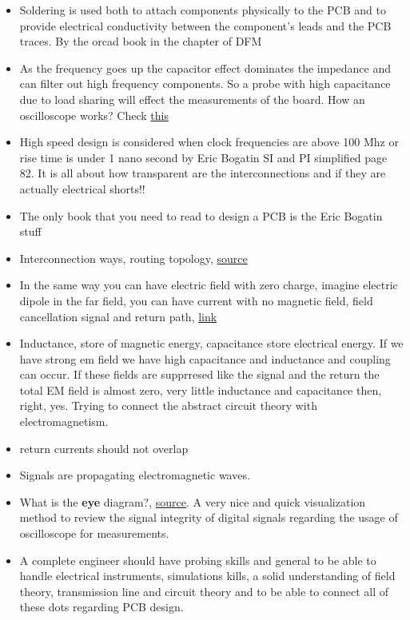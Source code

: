 \documentclass[12pt]{article}
\begin{document}
\begin{itemize}
	\item Soldering is used both to attach components physically to the PCB and to provide electrical conductivity between the component’s leads and the PCB traces. By the orcad book in the chapter of DFM
	\item As the frequency goes up the capacitor effect dominates the impedance and can filter out high frequency components. So a probe with high capacitance due to load sharing will effect the measurements of the board. How an oscilloscope works? Check \href{https://www.allaboutcircuits.com/worksheets/basic-oscilloscope-operation/}{this}
	\item High speed design is considered when clock frequencies are above 100 Mhz or rise time is under 1 nano second by Eric Bogatin SI and PI simplified page 82. It is all about how transparent are the interconnections and if they are actually electrical shorts!!
	\item The only book that you need to read to design a PCB is the Eric Bogatin stuff
	\item Interconnection ways, routing topology, \href{https://resources.pcb.cadence.com/blog/pcb-routing-topologies-demystified}{source}
	\item In the same way you can have electric field with zero charge, imagine electric dipole in the far field, you can have current with no magnetic field, field cancellation signal and return path, \href{http://www.sigcon.com/Pubs/edn/FieldCancellation.htm}{link}
	\item Inductance, store of magnetic energy, capacitance store electrical energy. If we have strong em field we have high capacitance and inductance and coupling can occur. If these fields are supprresed like the signal and the return the total EM field is almost zero, very little inductance and capacitance then, right, yes. Trying to connect the abstract circuit theory with electromagnetism. 
	\item return currents should not overlap
	\item Signals are propagating electromagnetic waves.
	\item What is the \textbf{eye} diagram?, \href{https://www.testandmeasurementtips.com/basics-eye-diagrams/}{source}. A very nice and quick visualization method to review the signal integrity of digital signals regarding the usage of oscilloscope for measurements.
	\item A complete engineer should have probing skills and general to be able to handle electrical instruments, simulations kills, a solid understanding of field theory, transmission line and circuit theory and to be able to connect all of these dots regarding PCB design.
	

\end{itemize}
\end{document}
